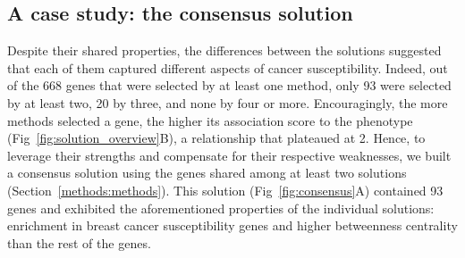 \documentclass[10pt,letterpaper]{article}
\begin{document}
\subsection{A case study: the consensus solution}
\label{results:consensus}

Despite their shared properties, the differences between the solutions suggested that each of them captured different aspects of cancer susceptibility. Indeed, out of the 668 genes that were selected by at least one method, only 93 were selected by at least two, 20 by three, and none by four or more. Encouragingly, the more methods selected a gene, the higher its association score to the phenotype (Fig~\ref{fig:solution_overview}B), a relationship that plateaued at 2. Hence, to leverage their strengths and compensate for their respective weaknesses, we built a consensus solution using the genes shared among at least two solutions (Section~\ref{methods:methods}). This solution (Fig~\ref{fig:consensus}A) contained 93 genes and exhibited the aforementioned properties of the individual solutions: enrichment in breast cancer susceptibility genes and higher betweenness centrality than the rest of the genes. 
\end{document}
